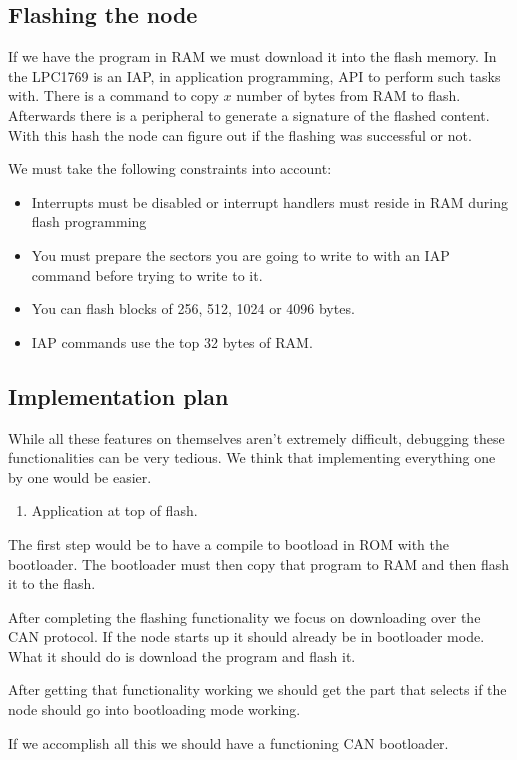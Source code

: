 \documentclass[twocolumn]{article}
\begin{document}
	\subsection*{Flashing the node}
		If we have the program in RAM we must download it into the flash memory.
		In the LPC1769 is an IAP, in application programming, API to perform such tasks with.
		There is a command to copy $x$ number of bytes from RAM to flash.
		Afterwards there is a peripheral to generate a signature of the flashed content.
		With this hash the node can figure out if the flashing was successful or not.
		
		We must take the following constraints into account:
		\begin{itemize}
			\item Interrupts must be disabled or interrupt handlers must reside in RAM during flash programming
			\item You must prepare the sectors you are going to write to with an IAP command before trying to write to it.
			\item You can flash blocks of 256, 512, 1024 or 4096 bytes.
			\item IAP commands use the top 32 bytes of RAM.
		\end{itemize}
	
	
	
	
	
	\subsection*{Implementation plan}
		While all these features on themselves aren't extremely difficult, debugging these functionalities can be very tedious.
		We think that implementing everything one by one would be easier.
		\begin{enumerate}
			\item Application at top of flash.
		\end{enumerate}
		
		The first step would be to have a compile to bootload in ROM with the bootloader.
		The bootloader must then copy that program to RAM and then flash it to the flash.
		
		After completing the flashing functionality we focus on downloading over the CAN protocol.
		If the node starts up it should already be in bootloader mode.
		What it should do is download the program and flash it.
		
		After getting that functionality working we should get the part that selects if the node should go into bootloading mode working.
		
		If we accomplish all this we should have a functioning CAN bootloader.
\end{document}
